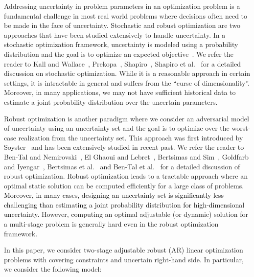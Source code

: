\documentclass[11pt]{article}
\theoremstyle{plain}
\theoremstyle{definition}
\numberwithin{equation}{section}%
\numberwithin{equation}{section}%
\newcommand*{\red}{\textcolor{black}}
\begin{document}
Addressing uncertainty in problem parameters in an optimization problem is a fundamental challenge in most real world problems where decisions often need to be made in the face of uncertainty. Stochastic and robust optimization are two approaches that have been studied extensively to handle uncertainty. In a stochastic optimization framework, uncertainty is modeled using a probability distribution and the goal is to optimize an expected objective~\cite{Dantzig55}. We refer the reader to Kall and Wallace~\cite{KW94}, Prekopa~\cite{Prekopa95}, Shapiro~\cite{Shapiro08}, Shapiro et al.~\cite{SDR09} for a detailed discussion on stochastic optimization. While it is a reasonable approach in certain settings, it is intractable in general and suffers from the ``curse of dimensionality''. Moreover, in many applications, we may not have sufficient historical data to estimate a joint probability distribution over the uncertain parameters.

Robust optimization is another paradigm where we consider an adversarial model of uncertainty using an uncertainty set and the goal is to optimize over the worst-case realization from the uncertainty set. This approach was first introduced by Soyster~\cite{SA73} and has been extensively studied in recent past. We refer the reader to Ben-Tal and Nemirovski~\cite{BN98,BN99,Ben-Tal02}, El Ghaoui and Lebret~\cite{EL97}, Bertsimas and Sim~\cite{BS03,BS04}, Goldfarb and Iyengar~\cite{GI03}, Bertsimas et al.~\cite{BBC08} and Ben-Tal et al.~\cite{BNE10} for a detailed discussion of robust optimization. Robust optimization leads to a tractable approach where an optimal static solution can be computed efficiently for a large class of problems. \red{Moreover, in many cases, designing an uncertainty set is significantly less challenging than estimating a joint probability distribution for high-dimensional uncertainty.} However, computing an optimal adjustable (or dynamic) solution for a multi-stage problem is generally hard even in the robust optimization framework.%



In this paper, we consider  two-stage adjustable robust (AR) linear optimization problems with covering constraints and uncertain right-hand side. In particular, we consider the following model:
\end{document}
